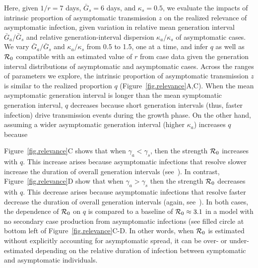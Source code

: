 Here, given $1/r=7$ days, $\bar G_s=6$ days, and $\kappa_s=0.5$, we evaluate the impacts of intrinsic proportion of asymptomatic transmission $z$ on the realized relevance of asymptomatic infection, given variation in relative mean generation interval $\bar G_a/\bar G_s$ and relative generation-interval dispersion $\kappa_a/\kappa_s$ of asymptomatic cases.
We vary $\bar G_a/\bar G_s$ and $\kappa_a/\kappa_s$ from 0.5 to 1.5, one at a time, and infer $q$ as well as ${\cal{R}}_0$ compatible with an estimated value of $r$ from case data given the generation interval distributions of asymptomatic and asymptomatic cases.
Across the ranges of parameters we explore, the intrinsic proportion of asymptomatic transmission $z$ is similar to the realized proportion $q$ (Figure~\ref{fig.relevance}A,C).
When the mean asymptomatic generation interval is longer than the mean symptomatic generation interval, $q$ decreases because short generation intervals (thus, faster infection) drive transmission events during the growth phase.
On the other hand, assuming a wider asymptomatic generation interval (higher $\kappa_a$) increases $q$ because 

Figure~\ref{fig.relevance}C shows that
when $\gamma_a<\gamma_s$, then the strength ${\cal{R}}_0$ increases
with $q$. 
This increase arises because asymptomatic infections that resolve
slower increase the duration of
overall generation intervals (see~\citep{park_2019practical}). In contrast,
Figure~\ref{fig.relevance}D show that
when $\gamma_a>\gamma_s$ then
the strength ${\cal{R}}_0$ decreases with $q$.  
This decrease arises because asymptomatic infections that resolve
faster decrease the duration of
overall generation intervals (again, see~\citep{park_2019practical}). In both 
cases, the dependence of ${\cal{R}}_0$ on $q$ is
compared to a baseline of 
${\cal{R}}_0\approx 3.1$ in a model with no secondary
case production from asymptomatic infections (see filled
circle at bottom left of Figure~\ref{fig.relevance}C-D.
In other words, when ${\cal{R}}_0$ is estimated without explicitly accounting for asymptomatic spread, it can be over- or under- estimated depending on the relative duration of infection between symptomatic and asymptomatic individuals.

